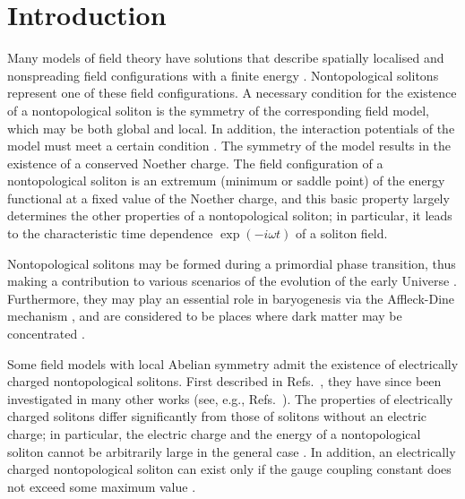\section{Introduction}
\label{seq:I}

Many models of  field  theory have solutions  that describe spatially localised
and nonspreading  field  configurations   with  a  finite  energy \cite{Manton,
 Rubakov}.
Nontopological solitons \cite{lee_pang_1992}  represent   one   of  these field
configurations.
A necessary condition for the  existence  of  a nontopological  soliton  is the
symmetry of the corresponding field  model, which may be both global and local.
In addition, the  interaction  potentials  of  the  model  must  meet a certain
condition \cite{coleman_npb_1985, paccetti_npb_2001}.
The symmetry of the model  results  in  the  existence  of  a conserved Noether
charge.
The field configuration  of  a nontopological  soliton  is an extremum (minimum
or saddle point) of the  energy  functional  at  a  fixed  value of the Noether
charge, and this basic property  largely  determines  the other properties of a
nontopological soliton; in particular,  it  leads  to  the  characteristic time
dependence $\exp \left( - i\omega t \right)$ of a soliton field.


Nontopological solitons may  be  formed  during  a primordial phase transition,
thus making a contribution to various scenarios of the  evolution  of the early
Universe \cite{kus_plb_1997}.
Furthermore, they  may  play  an   essential   role   in  baryogenesis  via the
Affleck-Dine  mechanism  \cite{aff_dine_npb_1985},  and   are  considered to be
places where dark matter may be concentrated \cite{kus_shp_plb_1998}.


Some field  models  with  local   Abelian   symmetry   admit  the  existence of
electrically charged nontopological solitons.
First  described  in   Refs.~\cite{ros_1968_2, klee},   they  have  since  been
investigated in  many  other works (see, e.g., Refs.~\cite{lee_yoon_1991, anag,
 levi,  rduvlk_2008,   ardoz_2009,   tamaki_2014,   gulamov_2014,  br_prd_2014,
  hong_prd_2015, gulamov_2015, lshnir_2019, loginov_2020, lshnir_2022}).
The properties  of  electrically  charged  solitons  differ  significantly from
those of solitons without  an  electric  charge;  in particular,  the  electric
charge and the energy  of a nontopological soliton cannot  be arbitrarily large
in the  general  case \cite{klee, gulamov_2015}.
In addition, an electrically  charged nontopological  soliton can exist only if
the gauge coupling constant does  not exceed  some  maximum  value \cite{klee}.


